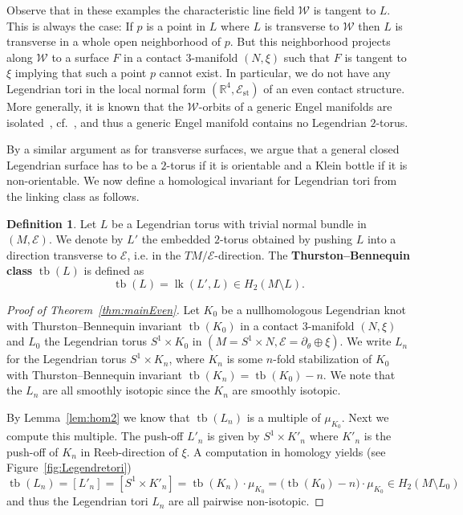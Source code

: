 \documentclass{amsart} %
\DeclareMathOperator{\tb}{tb}
\DeclareMathOperator{\lk}{lk}
\newcommand{\R}{\mathbb{R}}
\newcommand{\Est}{\mathcal{E}_{\mathrm{st}}}
\newcommand{\E}{\mathcal{E}}
\newcommand{\W}{\mathcal{W}}
\theoremstyle{thm}
\theoremstyle{definition}
\newtheorem{defi}[Theorem]{Definition}
\begin{document}
Observe that in these examples the characteristic line field $\W$ is tangent to $L$. This is always the case: If $p$ is a point in $L$ where $L$ is transverse to $\W$ then $L$ is transverse in a whole open neighborhood of $p$. But this neighborhood projects along $\W$ to a surface $F$ in a contact $3$-manifold $(N,\xi)$ such that $F$ is tangent to $\xi$ implying that such a point $p$ cannot exist. In particular, we do not have any Legendrian tori in the local normal form $(\R^4,\Est)$ of an even contact structure. More generally, it is known that the $\W$-orbits of a generic Engel manifolds are isolated~\cite[Theorem~27]{PP19}, cf.~\cite{Mo99}, and thus a generic Engel manifold contains no Legendrian $2$-torus.

By a similar argument as for transverse surfaces, we argue that a general closed Legendrian surface has to be a $2$-torus if it is orientable and a Klein bottle if it is non-orientable.
We now define a homological invariant for Legendrian tori from the linking class as follows.

\begin{defi}
Let $L$ be a Legendrian torus with trivial normal bundle in $(M,\E)$. We denote by $L'$ the embedded $2$-torus obtained by pushing $L$ into a direction transverse to $\E$, i.e. in the $TM/\E$-direction.
The \textbf{Thurston--Bennequin class} $\tb(L)$ is defined as
$$\tb(L)=\lk(L',L)\in H_2(M\setminus L).$$
\end{defi}


\begin{proof}[Proof of Theorem~\ref{thm:mainEven}]
	Let $K_0$ be a nullhomologous Legendrian knot with Thurston--Bennequin invariant $\tb(K_0)$ in a contact $3$-manifold $(N,\xi)$ and $L_0$ the Legendrian torus $S^1\times K_0$ in $(M=S^1\times N,\E=\partial_\theta\oplus\xi)$. We write $L_n$ for the Legendrian torus $S^1\times K_n$, where $K_n$ is some $n$-fold stabilization of $K_0$ with Thurston--Bennequin invariant $\tb(K_n)=\tb(K_0)-n$. We note that the $L_n$ are all smoothly isotopic since the $K_n$ are smoothly isotopic.
	
By Lemma~\ref{lem:hom2} we know that $\tb(L_n)$ is a multiple of $\mu_{K_0}$. Next we compute this multiple. The push-off $L'_n$ is given by $S^1\times K'_n$ where $K'_n$ is the push-off of $K_n$ in Reeb-direction of $\xi$. A computation in homology yields (see Figure~\ref{fig:Legendretori})
\begin{equation*}
\tb(L_n)=[L'_n]=[S^1\times K'_n]=\tb(K_n)\cdot\mu_{K_0}=\big(\tb(K_0)-n\big)\cdot\mu_{K_0}\in H_2(M\setminus L_0)
\end{equation*}
and thus the Legendrian tori $L_n$ are all pairwise non-isotopic.
\end{proof}
\end{document}
